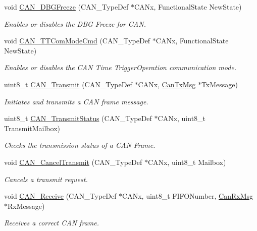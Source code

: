 \begin{DoxyCompactItemize}
void \hyperlink{group___c_a_n_gac0e2d33e08caf49d1f1251f0dcc20213}{C\-A\-N\-\_\-\-D\-B\-G\-Freeze} (C\-A\-N\-\_\-\-Type\-Def $\ast$C\-A\-Nx, Functional\-State New\-State)
\begin{DoxyCompactList}\small\item\em Enables or disables the D\-B\-G Freeze for C\-A\-N. \end{DoxyCompactList}\item 
void \hyperlink{group___c_a_n_ga94740177bab153ca5b102d122f9a8cca}{C\-A\-N\-\_\-\-T\-T\-Com\-Mode\-Cmd} (C\-A\-N\-\_\-\-Type\-Def $\ast$C\-A\-Nx, Functional\-State New\-State)
\begin{DoxyCompactList}\small\item\em Enables or disables the C\-A\-N Time Trigger\-Operation communication mode. \end{DoxyCompactList}\item 
uint8\-\_\-t \hyperlink{group___c_a_n_gaccfcb81f76f58400077c7b2d8641dd83}{C\-A\-N\-\_\-\-Transmit} (C\-A\-N\-\_\-\-Type\-Def $\ast$C\-A\-Nx, \hyperlink{struct_can_tx_msg}{Can\-Tx\-Msg} $\ast$Tx\-Message)
\begin{DoxyCompactList}\small\item\em Initiates and transmits a C\-A\-N frame message. \end{DoxyCompactList}\item 
uint8\-\_\-t \hyperlink{group___c_a_n_ga68ab05a0a6cdfcc2b6f6b6b2c10848e2}{C\-A\-N\-\_\-\-Transmit\-Status} (C\-A\-N\-\_\-\-Type\-Def $\ast$C\-A\-Nx, uint8\-\_\-t Transmit\-Mailbox)
\begin{DoxyCompactList}\small\item\em Checks the transmission status of a C\-A\-N Frame. \end{DoxyCompactList}\item 
void \hyperlink{group___c_a_n_ga81106cdf5395a1947bfc87ec1685829e}{C\-A\-N\-\_\-\-Cancel\-Transmit} (C\-A\-N\-\_\-\-Type\-Def $\ast$C\-A\-Nx, uint8\-\_\-t Mailbox)
\begin{DoxyCompactList}\small\item\em Cancels a transmit request. \end{DoxyCompactList}\item 
void \hyperlink{group___c_a_n_ga351b90bb8a3bb0c846f85bbd56ef4dc8}{C\-A\-N\-\_\-\-Receive} (C\-A\-N\-\_\-\-Type\-Def $\ast$C\-A\-Nx, uint8\-\_\-t F\-I\-F\-O\-Number, \hyperlink{struct_can_rx_msg}{Can\-Rx\-Msg} $\ast$Rx\-Message)
\begin{DoxyCompactList}\small\item\em Receives a correct C\-A\-N frame. \end{DoxyCompactList}\item 

\end{DoxyCompactItemize}
